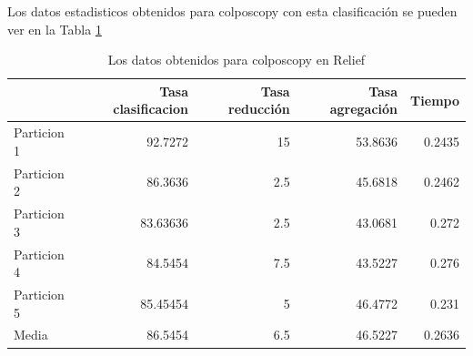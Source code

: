 \documentclass[12pt,a4paper]{article}
\begin{document}
Los datos estadisticos obtenidos para colposcopy con esta clasificación se pueden ver en la Tabla \ref{tab:rcolposcopy}
\begin{table}[H]
	\centering
	\caption {Los datos obtenidos para colposcopy en Relief} \label{tab:rcolposcopy} 
	
	\begin{tabular}{|l|r|r|r|r|}
		\hline
		& Tasa clasificacion &Tasa reducción &Tasa agregación & Tiempo\\
		\hline
		Particion 1 & 92.7272 &15 & 53.8636& 0.2435 \\
		\hline
		Particion 2 & 86.3636 & 2.5& 45.6818& 0.2462 \\
		\hline
		Particion 3 & 83.63636 & 2.5& 43.0681& 0.272\\
		\hline
		Particion 4 & 84.5454 & 7.5&43.5227 &  0.276\\
		\hline
		Particion 5 & 85.45454 & 5&46.4772 & 0.231 \\
		\hline
		Media & 86.5454 &6.5 &46.5227 & 0.2636 \\
		\hline
	\end{tabular}
\end{table}
\end{document}
